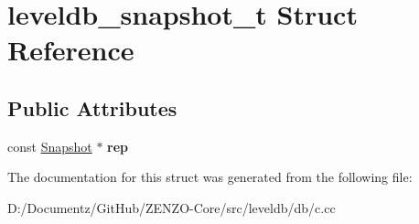 \hypertarget{structleveldb__snapshot__t}{}\section{leveldb\+\_\+snapshot\+\_\+t Struct Reference}
\label{structleveldb__snapshot__t}
\subsection*{Public Attributes}
\begin{DoxyCompactItemize}
\item 
\mbox{\label{structleveldb__snapshot__t_a36f57ffdcd88fa73322d8e2e637e3b6a}} 
const \mbox{\hyperlink{classleveldb_1_1_snapshot}{Snapshot}} $\ast$ {\bfseries rep}
\end{DoxyCompactItemize}


The documentation for this struct was generated from the following file\+:\begin{DoxyCompactItemize}
\item 
D\+:/\+Documentz/\+Git\+Hub/\+Z\+E\+N\+Z\+O-\/\+Core/src/leveldb/db/c.\+cc\end{DoxyCompactItemize}

